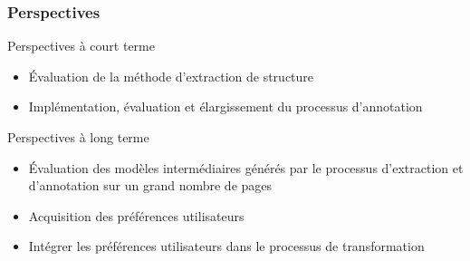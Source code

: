 \documentclass[9pt]{beamer}
\begin{document}
\begin{frame}
	\frametitle{Perspectives}
		\begin{block}{Perspectives à court terme}
		\begin{itemize}
			\item Évaluation de la méthode d'extraction de structure
			\item Implémentation, évaluation et élargissement du processus d'annotation
		\end{itemize}
	\end{block}
	\begin{block}{Perspectives à long terme}
		\begin{itemize}
			\item Évaluation des modèles intermédiaires générés par le processus d'extraction et d'annotation sur un grand nombre de pages 
			\item Acquisition des préférences utilisateurs
			\item Intégrer les préférences utilisateurs dans le processus de transformation
		\end{itemize}
	\end{block}
\end{frame}


 
\end{document}
